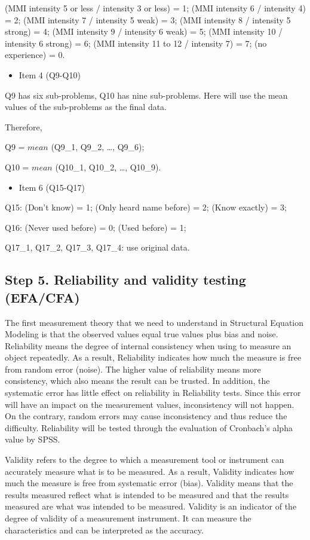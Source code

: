 (MMI intensity 5 or less / intensity 3 or less) = 1; (MMI intensity 6 / intensity 4) = 2; (MMI intensity 7 / intensity 5 weak) = 3; (MMI intensity 8 / intensity 5 strong) = 4; (MMI intensity 9 / intensity 6 weak) = 5; (MMI intensity 10 / intensity 6 strong) = 6; (MMI intensity 11 to 12 / intensity 7) = 7; (no experience) = 0.


\begin{itemize}
\item Item 4 (Q9-Q10)
\end{itemize}

Q9 has six sub-problems, Q10 has nine sub-problems. Here will use the mean values of the sub-problems as the final data. 

Therefore, 

Q9 = $mean$ (Q9\_1, Q9\_2, \dots, Q9\_6);

Q10 = $mean$ (Q10\_1, Q10\_2, \dots, Q10\_9).

\begin{itemize}
\item Item 6 (Q15-Q17)
\end{itemize}

Q15: (Don't know) = 1; (Only heard name before) = 2; (Know exactly) = 3;

Q16: (Never used before) = 0; (Used before) = 1;
 
Q17\_1, Q17\_2, Q17\_3, Q17\_4: use original data.

\subsection{Step 5. Reliability and validity testing (EFA/CFA)}
\label{step5}
The first measurement theory that we need to understand in Structural Equation Modeling is that the observed values equal true values plus bias and noise. Reliability means the degree of internal consistency when using to measure an object repeatedly. As a result, Reliability indicates how much the measure is free from random error (noise). The higher value of reliability means more consistency, which also means the result can be trusted. In addition, the systematic error has little effect on reliability in Reliability tests. Since this error will have an impact on the measurement values, inconsistency will not happen. On the contrary, random errors may cause inconsistency and thus reduce the difficulty. Reliability will be tested through the evaluation of Cronbach's alpha value by SPSS. 

Validity refers to the degree to which a measurement tool or instrument can accurately measure what is to be measured. As a result, Validity indicates how much the measure is free from systematic error (bias). Validity means that the results measured reflect what is intended to be measured and that the results measured are what was intended to be measured. Validity is an indicator of the degree of validity of a measurement instrument. It can measure the characteristics and can be interpreted as the accuracy. 

